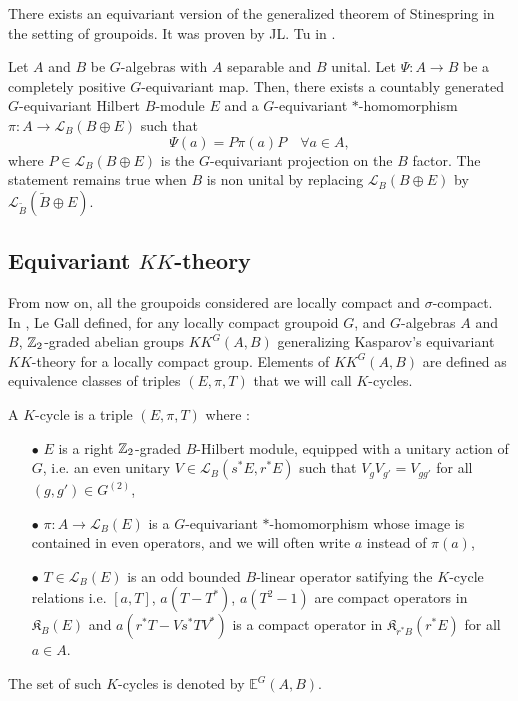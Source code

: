 There exists an equivariant version of the generalized theorem of Stinespring in the setting of groupoids. It was proven by JL. Tu in \cite{TuNovikov}.

\begin{thm} \label{GKasparovStinespring} Let $A$ and $B$ be $G$-algebras with $A$ separable and $B$ unital. Let $\Psi : A \rightarrow B$ be a completely positive $G$-equivariant map. Then, there exists a countably generated $G$-equivariant Hilbert $B$-module $E$ and a $G$-equivariant $*$-homomorphism $\pi : A \rightarrow \mathcal L_B (B\oplus E)$ such that
\[\Psi( a) = P \pi(a) P \quad \forall a\in A,\]
where $P\in\mathcal L_B(B\oplus E)$ is the $G$-equivariant projection on the $B$ factor. The statement remains true when $B$ is non unital by replacing $\mathcal L_B (B\oplus E)$ by $\mathcal L_{\tilde B} (\tilde{B}\oplus E)$.
\end{thm}
\subsection{Equivariant $KK$-theory}

From now on, all the groupoids considered are locally compact and $\sigma$-compact.\\

In \cite{LeGall}, Le Gall defined, for any locally compact groupoid $G$, and $G$-algebras $A$ and $B$, $\mathbb Z_2$-graded abelian groups $KK^G(A,B)$ generalizing Kasparov's equivariant $KK$-theory for a locally compact group. Elements of $KK^G(A,B)$ are defined as equivalence classes of triples $(E,\pi,T)$ that we will call $K$-cycles.

\begin{definition} A $K$-cycle is a triple $(E,\pi,T)$ where :
\begin{itemize}
\item[$\bullet$] $E$ is a right $\mathbb Z_2$-graded $B$-Hilbert module, equipped with a unitary action of $G$, i.e. an even unitary $V\in\mathcal L_B(s^*E,r^*E)$ such that $V_g V_{g'} = V_{gg'}$ for all $(g,g')\in G^{(2)}$,
\item[$\bullet$] $\pi : A\rightarrow \mathcal L_B(E)$ is a $G$-equivariant $*$-homomorphism whose image is contained in even operators, and we will often write $a$ instead of $\pi(a)$,
\item[$\bullet$] $T\in\mathcal L_B(E)$ is an odd bounded $B$-linear operator satifying the $K$-cycle relations i.e. $[a, T]$, $a(T-T^*)$, $a(T^2-1)$ are compact operators in $\mathfrak K_B(E)$ and $a(r^* T -V s^*T V^*)$ is a compact operator in $\mathfrak K_{r^* B}(r^* E)$ for all $a\in A$.
\end{itemize} 
The set of such $K$-cycles is denoted by $\mathbb E^G(A,B)$.
\end{definition}

